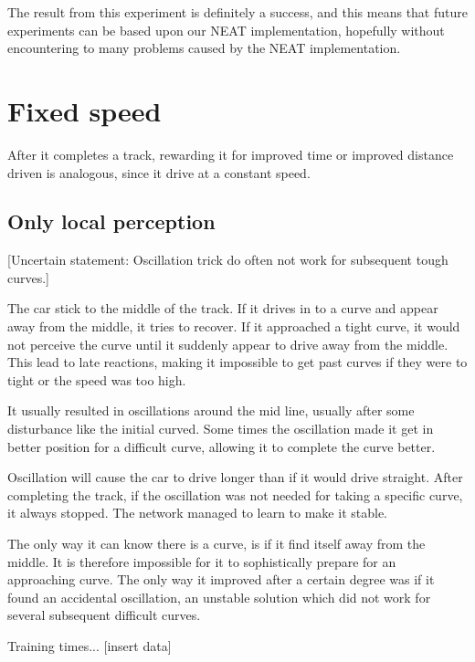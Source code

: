The result from this experiment is definitely a success, and this means that future experiments can be based upon our NEAT implementation, hopefully without encountering to many problems caused by the NEAT implementation. 




\section{Fixed speed}

After it completes a track, rewarding it for improved time or improved distance driven is analogous, since it drive at a constant speed.


\subsection{Only local perception}
[Uncertain statement: Oscillation trick do often not work for subsequent tough curves.]

The car stick to the middle of the track. If it drives in to a curve and appear away from the middle, it tries to recover. If it approached a tight curve, it would not perceive the curve until it suddenly appear to drive away from the middle. This lead to late reactions, making it impossible to get past curves if they were to tight or the speed was too high.

It usually resulted in oscillations around the mid line, usually after some disturbance like the initial curved. Some times the oscillation made it get in better position for a difficult curve, allowing it to complete the curve better. 

Oscillation will cause the car to drive longer than if it would drive straight. After completing the track, if the oscillation was not needed for taking a specific curve, it always stopped. The network managed to learn to make it stable. 

The only way it can know there is a curve, is if it find itself away from the middle. It is therefore impossible for it to sophistically prepare for an approaching curve. The only way it improved after a certain degree was if it found an accidental oscillation, an unstable solution which did not work for several subsequent difficult curves.

Training times... [insert data]

